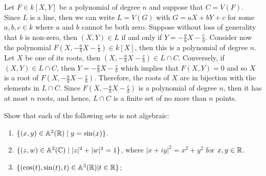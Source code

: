 \begin{solution}
    Let $F \in k[X,Y]$ be a polynomial of degree $n$ and suppose that $C = V(F)$. Since $L$ is a line, then we can write $L = V(G)$ with $G = aX + bY + c$ for some $a,b,c\in k$ where $a$ and $b$ cannot be both zero. Suppose without loss of generality that $b$ is non-zero, then $(X,Y) \in L$ if and only if $Y = -\frac{a}{b}X - \frac{c}{b}$. Consider now the polynomial $F(X, -\frac{a}{b}X - \frac{c}{b}) \in k[X]$, then this is a polynomial of degree $n$. Let $X$ be one of its roots, then $(X, -\frac{a}{b}X - \frac{c}{b}) \in L \cap C$. Conversely, if $(X,Y) \in L \cap C$, then $Y = -\frac{a}{b}X - \frac{c}{b}$ which implies that $F(X,Y) = 0$ and so $X$ is a root of $F(X, -\frac{a}{b}X - \frac{c}{b})$. Therefore, the roots of $X$ are in bijection with the elements in $L \cap C$. Since $F(X, -\frac{a}{b}X - \frac{c}{b})$ is a polynomial of degree $n$, then it has at most $n$ roots, and hence, $L \cap C$ is a finite set of no more than $n$ points. \\
\end{solution}

\begin{exercise}
    Show that each of the following sets is not algebraic:
    \begin{enumerate}[label=(\alph*)]
        \item $\{(x,y) \in \mathbb{A}^2(\mathbb{R}) \mid y = \sin(x)\}$.
        \item $\{(z,w) \in \mathbb{A}^2(\mathbb{C}) \mid |z|^2 + |w|^2 = 1\}$, where $|x + iy|^2 = x^2 + y^2$ for $x,y \in \mathbb{R}$.
        \item $\{(\cos(t), \sin(t), t) \in \mathbb{A}^3(\mathbb{R}) | t \in \mathbb{R}\}$;
    \end{enumerate}
\end{exercise}

